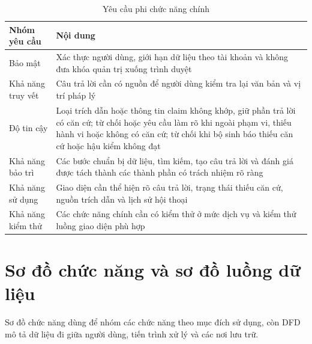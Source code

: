 \documentclass[12pt,a4paper,oneside]{report}
\begin{document}
\begin{table}[H]
  \caption{Yêu cầu phi chức năng chính}
  \label{tab:nonfunctional-requirements}
  \centering
  \begin{tabularx}{\textwidth}{|L{3.4cm}|Y|}
    \hline
    \textbf{Nhóm yêu cầu} & \textbf{Nội dung}                                                                                                                                                                                                           \\
    \hline
    Bảo mật               & Xác thực người dùng, giới hạn dữ liệu theo tài khoản và không đưa khóa quản trị xuống trình duyệt                                                                                                                           \\
    \hline
    Khả năng truy vết     & Câu trả lời cần có nguồn để người dùng kiểm tra lại văn bản và vị trí pháp lý                                                                                                                                               \\
    \hline
    Độ tin cậy            & Loại trích dẫn hoặc thông tin claim không khớp, giữ phần trả lời có căn cứ; từ chối hoặc yêu cầu làm rõ khi ngoài phạm vi, thiếu hành vi hoặc không có căn cứ; từ chối khi bộ sinh báo thiếu căn cứ hoặc hậu kiểm không đạt \\
    \hline
    Khả năng bảo trì      & Các bước chuẩn bị dữ liệu, tìm kiếm, tạo câu trả lời và đánh giá được tách thành các thành phần có trách nhiệm rõ ràng                                                                                                      \\
    \hline
    Khả năng sử dụng      & Giao diện cần thể hiện rõ câu trả lời, trạng thái thiếu căn cứ, nguồn trích dẫn và lịch sử hội thoại                                                                                                                        \\
    \hline
    Khả năng kiểm thử     & Các chức năng chính cần có kiểm thử ở mức dịch vụ và kiểm thử luồng giao diện phù hợp                                                                                                                                       \\
    \hline
  \end{tabularx}
\end{table}

\section{Sơ đồ chức năng và sơ đồ luồng dữ liệu}
Sơ đồ chức năng dùng để nhóm các chức năng theo mục đích sử dụng, còn DFD mô tả dữ liệu đi giữa người dùng, tiến trình xử lý và các nơi lưu trữ.
\end{document}
